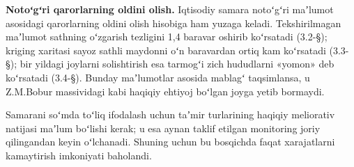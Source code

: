 \textbf{Notoʻgʻri qarorlarning oldini olish.} Iqtisodiy samara notoʻgʻri
maʼlumot asosidagi qarorlarning oldini olish hisobiga ham yuzaga keladi.
Tekshirilmagan maʼlumot sathning oʻzgarish tezligini 1,4 baravar oshirib
koʻrsatadi (3.2-§); kriging xaritasi sayoz sathli maydonni oʻn
baravardan ortiq kam koʻrsatadi (3.3-§); bir yildagi joylarni
solishtirish esa tarmogʻi zich hududlarni «yomon» deb koʻrsatadi
(3.4-§). Bunday maʼlumotlar asosida mablagʻ taqsimlansa, u Z.M.Bobur
massividagi kabi haqiqiy ehtiyoj boʻlgan joyga yetib bormaydi.

Samarani soʻmda toʻliq ifodalash uchun taʼmir turlarining haqiqiy
meliorativ natijasi maʼlum boʻlishi kerak; u esa aynan taklif etilgan
monitoring joriy qilingandan keyin oʻlchanadi. Shuning uchun bu
bosqichda faqat xarajatlarni kamaytirish imkoniyati baholandi.


